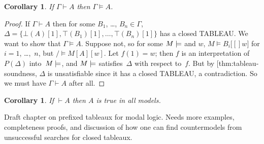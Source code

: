 \documentclass[10pt,a4paper]{article}
\makeatletter
\newcommand*{\olup}[1]{\MakeUppercase{#1}}
\theoremstyle{plain}
\newtheorem{cor}[thm]{Corollary}
\theoremstyle{definition}
\theoremstyle{remark}
\newenvironment{editorial}{}{}
\newcommand*{\olchapter}[3]{}
\newcommand*{\olimport}[1]{}
\newcommand*{\ollabel}[1]{\label{#1}}
\newcommand{\olref}{\@ifnextchar[{\olref@i}{\olref@final}}
\def\olref@i[#1]{\@ifnextchar[{\olref@ii}{\olref@final}}
\def\olref@ii[#1]{\@ifnextchar[{\olref@iii}{\olref@final}}
\def\olref@iii[#1]{\olref@final}
\def\olref@final#1{\ref{#1}}
\providecommand{\Proves}{\mathrel{\vdash}}
\providecommand{\Entails}{\mathrel{\models}}
\providecommand{\sFmla}[2]{#1(#2)}
\providecommand{\True}{\top}
\providecommand{\False}{\bot}
\providecommand{\mSat}[3]{\ensuremath{#1 \models #2[#3]}}
\providecommand{\mModel}[2]{\ensuremath{#1 \models #2}}
\makeatother
\begin{document}
\begin{cor}
\ollabel{cor:entailment-soundness}
If $\Gamma \Proves A$ then $\Gamma \Entails A$.
\end{cor}

\begin{proof}
  If $\Gamma \Proves A$ then for some $B_1$, \dots, $B_n \in
  \Gamma$, $\Delta = \{\sFmla{\False}{A}[1], \sFmla{\True}{B_1}[1],
  \dots, \sFmla{\True}{B_n}[1]\}$ has a closed \olup{tableau}. We want
  to show that $\Gamma \Entails A$. Suppose not, so for some
  $\mModel{M}$ and $w$, $\mSat{M}{B_i}[w]$ for $i=1$, \dots,~$n$, but
  $\mSat/{M}{A}[w]$. Let $f(1) = w$; then $f$ is an interpretation
  of~$P(\Delta)$ into~$\mModel{M}$, and $\mModel{M}$ satisfies~$\Delta$ with
  respect to~$f$. But by \olref{thm:tableau-soundness}, $\Delta$ is
  unsatisfiable since it has a closed \olup{tableau}, a
  contradiction. So we must have $\Gamma \Proves A$ after all.
\end{proof}

\begin{cor}
\ollabel{cor:weak-soundness}
If $\Proves A$ then $A$ is true in all models.
\end{cor}





\olchapter{nml}{tab}{Modal \usetoken{P}{tableau}}

\begin{editorial}
  Draft chapter on prefixed tableaux for modal logic. Needs more
  examples, completeness proofs, and discussion of how one can find
  countermodels from unsuccessful searches for closed tableaux.
\end{editorial}

\olimport{introduction}
\olimport{rules-for-K}
\olimport{proofs-in-K}
\olimport{soundness}
\olimport{more-rules}
\olimport{more-soundness}
\olimport{simple-S5}
\olimport{completeness}
\olimport{countermodels}

\OLEndChapterHook
\end{document}
